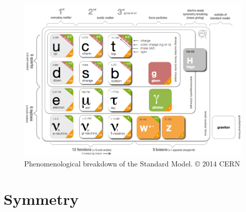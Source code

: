 \begin{figure}[h]
   \centering
    \includegraphics[width=\textwidth]{SMdiagram}
    \caption{Phenomenological breakdown of the Standard Model. © 2014 CERN}
\end{figure}

\section{Symmetry}
% 
% 
